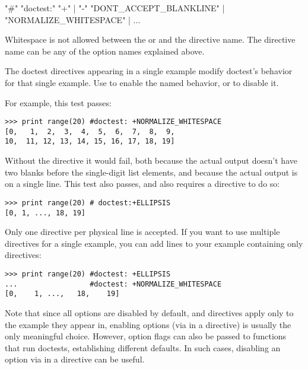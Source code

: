 \begin{productionlist}[doctest]
               {"\#" "doctest:"  }
               {"+" | "-"}
               {"DONT_ACCEPT_BLANKLINE" | "NORMALIZE_WHITESPACE" | ...}
\end{productionlist}

Whitespace is not allowed between the \code{+} or \code{-} and the
directive name.  The directive name can be any of the option names
explained above.

The doctest directives appearing in a single example modify doctest's
behavior for that single example.  Use \code{+} to enable the named
behavior, or \code{-} to disable it.

For example, this test passes:

\begin{verbatim}
>>> print range(20) #doctest: +NORMALIZE_WHITESPACE
[0,   1,  2,  3,  4,  5,  6,  7,  8,  9,
10,  11, 12, 13, 14, 15, 16, 17, 18, 19]
\end{verbatim}

Without the directive it would fail, both because the actual output
doesn't have two blanks before the single-digit list elements, and
because the actual output is on a single line.  This test also passes,
and also requires a directive to do so:

\begin{verbatim}
>>> print range(20) # doctest:+ELLIPSIS
[0, 1, ..., 18, 19]
\end{verbatim}

Only one directive per physical line is accepted.  If you want to
use multiple directives for a single example, you can add
 lines to your example containing only directives:

\begin{verbatim}
>>> print range(20) #doctest: +ELLIPSIS
...                 #doctest: +NORMALIZE_WHITESPACE
[0,    1, ...,   18,    19]
\end{verbatim}

Note that since all options are disabled by default, and directives apply
only to the example they appear in, enabling options (via \code{+} in a
directive) is usually the only meaningful choice.  However, option flags
can also be passed to functions that run doctests, establishing different
defaults.  In such cases, disabling an option via \code{-} in a directive
can be useful.

